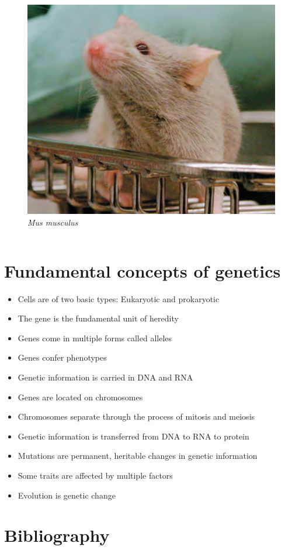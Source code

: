 \documentclass[11pt,ignorenonframetext,aspectratio=169]{beamer}
\providecommand{\tightlist}{%
  \setlength{\itemsep}{0pt}\setlength{\parskip}{0pt}}
\begin{document}
\begin{frame}{}
\begin{columns}[T,onlytextwidth]

\begin{figure}
\includegraphics[width=0.8\linewidth]{../images/model_organisms_mus} \caption{\textit{Mus musculus}}\label{fig:model-organisms-mus}
\end{figure}

\end{columns}
\end{frame}

\hypertarget{fundamental-concepts-of-genetics}{%
\section{Fundamental concepts of
genetics}\label{fundamental-concepts-of-genetics}}

\begin{frame}{}
\protect\hypertarget{section-2}{}
\begin{itemize}[<+->]
\tightlist
\item
  Cells are of two basic types: \alert{Eukaryotic} and
  \alert{prokaryotic}
\item
  The gene is the fundamental unit of heredity
\item
  Genes come in multiple forms called alleles
\item
  Genes confer phenotypes
\item
  Genetic information is carried in DNA and RNA
\item
  Genes are located on chromosomes
\item
  Chromosomes separate through the process of mitosis and meiosis
\item
  Genetic information is transferred from DNA to RNA to protein
\item
  Mutations are permanent, heritable changes in genetic information
\item
  Some traits are affected by multiple factors
\item
  Evolution is genetic change
\end{itemize}
\end{frame}

\hypertarget{bibliography}{%
\section{Bibliography}\label{bibliography}}
\end{document}
